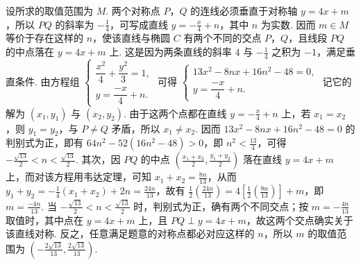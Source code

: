 \begin{solution}

设所求的取值范围为 \(M\). 两个对称点 \(P\)，\(Q\) 的连线必须垂直于对称轴 \(y=4x+m\)，所以 \(PQ\) 的斜率为 \(-\frac14\)，可写成直线 \(y=-\frac{x}{4}+n\)，其中 \(n\) 为实数. 因而 \(m\in M\) 等价于存在这样的 \(n\)，使该直线与椭圆 \(C\) 有两个不同的交点 \(P\)，\(Q\)，且线段 \(PQ\) 的中点落在 \(y=4x+m\) 上. 这是因为两条直线的斜率 \(4\) 与 \(-\frac14\) 之积为 \(-1\)，满足垂直条件. 由方程组 \(\begin{cases}
\dfrac{x^{2}}{4}+\dfrac{y^{2}}{3}=1,\\
y=\dfrac{-x}{4}+n.
\end{cases}\) 可得 \(\begin{cases}
13x^{2}-8nx+16n^{2}-48=0,\\
y=\dfrac{-x}{4}+n.
\end{cases}\)
记它的解为 \((x_{1}, y_{1}) \) 与 \((x_{2}, y_{2}) \). 由于这两个点都在直线 \(y=-\frac{x}{4}+n\) 上，若 \(x_{1}=x_{2}\)，则 \(y_{1}=y_{2}\)，与 \(P\ne Q\) 矛盾，所以 \(x_{1}\ne x_{2}\). 因而
\(13x^{2}-8nx+16n^{2}-48=0\) 的判别式为正，即有 \(64n^{2}-52(16n^{2}-48)>0\)，即 \(n^{2}<\frac{13}{4}\)，可得 \(-\frac{\sqrt{13}}{2}<n<\frac{\sqrt{13}}{2}\). 其次，因 \(PQ\) 的中点 \(\left(\frac{x_{1}+x_{2}}{2},\frac{y_{1}+y_{2}}{2}\right)\) 落在直线 \(y=4x+m\) 上，而对该方程用韦达定理，可知 \(x_{1}+x_{2}=\frac{8n}{13}\)，从而 \(y_{1}+y_{2}=-\frac{1}{4}(x_{1}+x_{2})+2n=\frac{24n}{13}\)，故有 \(\frac{1}{2}\left(\frac{24n}{13}\right)=4\left[\frac{1}{2}\left(\frac{8n}{13}\right)\right]+m\)，即 \(m=\frac{-4n}{13}\). 当 \(-\frac{\sqrt{13}}{2}<n<\frac{\sqrt{13}}{2}\) 时，判别式为正，确有两个不同交点；按 \(m=-\frac{4n}{13}\) 取值时，其中点在 \(y=4x+m\) 上，且 \(PQ\perp y=4x+m\)，故这两个交点确实关于该直线对称. 反之，任意满足题意的对称点都必对应这样的 \(n\)，所以 \(m\) 的取值范围为 \(\left(-\frac{2\sqrt{13}}{13},\frac{2\sqrt{13}}{13}\right)\).
\end{solution}
